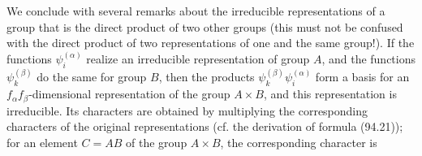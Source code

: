 We conclude with several remarks about the irreducible representations of a group that is the direct product of two other groups (this must not be confused with the direct product of two representations of one and the same group!). If the functions $\psi_i^{(\alpha)}$ realize an irreducible representation of group $A$, and the functions $\psi_k^{(\beta)}$ do the same for group $B$, then the products $\psi_k^{(\beta)}\psi_i^{(\alpha)}$ form a basis for an $f_\alpha f_\beta$-dimensional representation of the group $A\times B$, and this representation is irreducible. Its characters are obtained by multiplying the corresponding characters of the original representations (cf. the derivation of formula (94.21)); for an element $C=AB$ of the group $A\times B$, the corresponding character is

